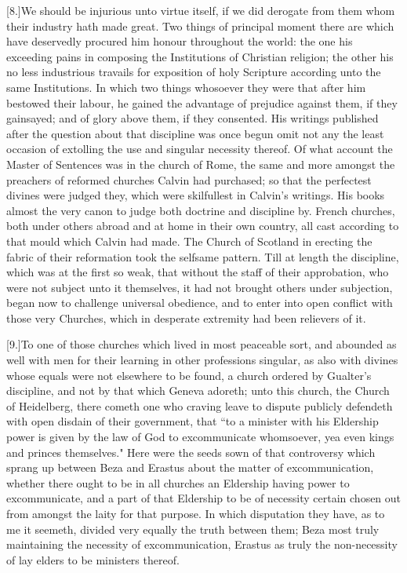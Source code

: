 [8.]We should be injurious unto virtue itself, if we did derogate from them whom their industry hath made great. Two things of principal moment there are which have deservedly procured him honour throughout the world: the one his exceeding pains in composing the Institutions of Christian religion; the other his no less industrious travails for exposition of holy Scripture according unto the same Institutions. In which two things whosoever they were that after him bestowed their labour, he gained the advantage of prejudice against them, if they gainsayed; and of glory above them, if they consented. His writings published after the question about that discipline was once begun omit not any the least occasion of extolling the use and singular necessity thereof. Of what account the Master of Sentences was in the church of Rome, the same and more amongst the preachers of reformed churches Calvin had purchased; so that the perfectest divines were judged they, which were skilfullest in Calvin’s writings. His books almost the very canon to judge both doctrine and discipline by. French churches, both under others abroad and at home in their own country, all cast according to that mould which Calvin had made. The Church of Scotland in erecting the fabric of their reformation took the selfsame pattern. Till at length the discipline, which was at the first so weak, that without the staff of their approbation, who were not subject unto it themselves, it had not brought others under subjection, began now to challenge universal obedience, and to enter into open conflict with those very Churches, which in desperate extremity had been relievers of it.

[9.]To one of those churches which lived in most peaceable sort, and abounded as well with men for their learning in other professions singular, as also with divines whose equals were not elsewhere to be found, a church ordered by Gualter’s discipline, and not by that which Geneva adoreth; unto this church, the Church of Heidelberg, there cometh one who craving leave to dispute publicly defendeth with open disdain of their government, that “to a minister with his Eldership power is given by the law of God to excommunicate whomsoever, yea even kings and princes themselves." Here were the seeds sown of that controversy which sprang up between Beza and Erastus about the matter of excommunication, whether there ought to be in all churches an Eldership having power to excommunicate, and a part of that Eldership to be of necessity certain chosen out from amongst the laity for that purpose. In which disputation they have, as to me it seemeth, divided very equally the truth between them; Beza most truly maintaining the necessity of excommunication, Erastus as truly the non-necessity of lay elders to be ministers thereof.

